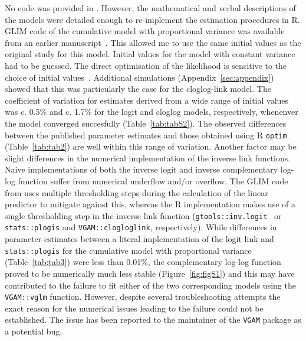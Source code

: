 No code was provided in \citep{candy1991modeling}. 
However, the mathematical and verbal descriptions of the models were detailed enough to re-implement the estimation procedures in R. 
GLIM code of the cumulative model with proportional variance was available from an earlier manuscript~\citep{candy1990biology}. 
This allowed me to use the same initial values as the original study for this model. 
Initial values for the model with constant variance had to be guessed.
The direct optimisation of the likelihood is sensitive to the choice of initial values~\citep{dennis1986stochastic}. 
Additional simulations (Appendix~\ref{sec:appendix}) showed that this was particularly the case for the cloglog-link model.
The coefficient of variation for estimates derived from a wide range of initial values was c. 0.5\% and c. 1.7\% for the logit and cloglog models, respectively, whenenver the model converged succesfully (Table~\ref{tab:tabS2}).
The observed differences between the published parameter estimates and those obtained using R \verb+optim+ (Table~\ref{tab:tab2}) are well within this range of variation.
Another factor may be slight differences in the numerical implementation of the inverse link functions. 
Naive implementations of both the inverse logit and inverse complementary log-log function suffer from numerical underflow and/or overflow. 
The GLIM code from \citep{candy1990biology} uses multiple thresholding steps during the calculation of the linear predictor to mitigate against this, whereas the R implementation makes use of a single thresholding step in the inverse link function (\verb+gtools::inv.logit+~\citep{gtools} or \verb+stats::plogis+ and \verb+VGAM::clogloglink+, respectively). 
While differences in parameter estimates between a literal implementation of the logit link and  \verb+stats::plogis+ for the cumulative model with proportional variance (Table~\ref{tab:tab3}) were less than 0.01\%, the complementary log-log function proved to be numerically much less stable (Figure~\ref{fig:figS1}) and this may have contributed to the failure to fit either of the two corresponding models using the \verb+VGAM::vglm+ function. 
However, despite several troubleshooting attempts the exact reason for the numerical issues leading to the failure could not be established.
The issue has been reported to the maintainer of the \verb+VGAM+ package as a potential bug.

\afterpage{\clearpage}
